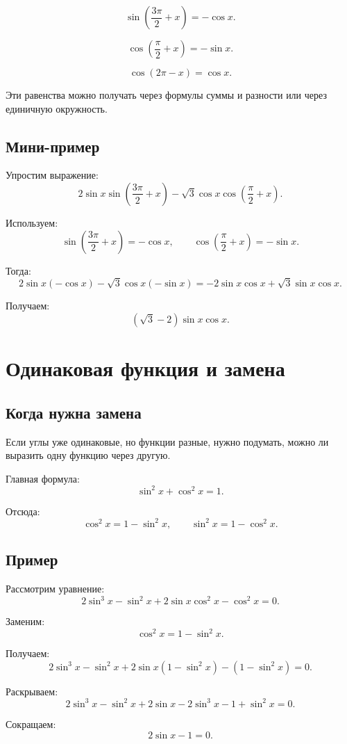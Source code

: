 \documentclass[a4paper,12pt]{article}
\begin{document}
\[
\sin\left(\frac{3\pi}{2}+x\right)=-\cos x.
\]

\[
\cos\left(\frac{\pi}{2}+x\right)=-\sin x.
\]

\[
\cos(2\pi-x)=\cos x.
\]

Эти равенства можно получать через формулы суммы и разности или через единичную окружность.

\subsection{Мини-пример}

Упростим выражение:
\[
2\sin x\sin\left(\frac{3\pi}{2}+x\right)
-\sqrt3\cos x\cos\left(\frac{\pi}{2}+x\right).
\]

Используем:
\[
\sin\left(\frac{3\pi}{2}+x\right)=-\cos x,
\qquad
\cos\left(\frac{\pi}{2}+x\right)=-\sin x.
\]

Тогда:
\[
2\sin x(-\cos x)-\sqrt3\cos x(-\sin x)
=
-\!2\sin x\cos x+\sqrt3\sin x\cos x.
\]

Получаем:
\[
(\sqrt3-2)\sin x\cos x.
\]

\section{Одинаковая функция и замена}

\subsection{Когда нужна замена}

Если углы уже одинаковые, но функции разные, нужно подумать, можно ли выразить одну функцию через другую.

Главная формула:
\[
\sin^2x+\cos^2x=1.
\]

Отсюда:
\[
\cos^2x=1-\sin^2x,
\qquad
\sin^2x=1-\cos^2x.
\]

\subsection{Пример}

Рассмотрим уравнение:
\[
2\sin^3x-\sin^2x+2\sin x\cos^2x-\cos^2x=0.
\]

Заменим:
\[
\cos^2x=1-\sin^2x.
\]

Получаем:
\[
2\sin^3x-\sin^2x+2\sin x(1-\sin^2x)-(1-\sin^2x)=0.
\]

Раскрываем:
\[
2\sin^3x-\sin^2x+2\sin x-2\sin^3x-1+\sin^2x=0.
\]

Сокращаем:
\[
2\sin x-1=0.
\]
\end{document}
